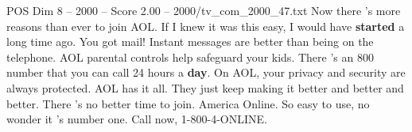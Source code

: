 \begin{textsample}{POS Dim 8 – 2000 – Score 2.00 – 2000/tv\_com\_2000\_47.txt}  \label{ex:f8_pos_033}
Now there 's more reasons than ever to join AOL.
If I knew it was this easy, I would have \textbf{started} a long time ago.
You got mail!
Instant messages are better than being on the telephone.
AOL parental controls help safeguard your kids.
There 's an 800 number that you can call 24 hours a \textbf{day}.
On AOL, your privacy and security are always protected.
AOL has it all.
They just keep making it better and better and better.
There 's no better time to join.
America Online.
So easy to use, no wonder it 's number one.
Call now, 1-800-4-ONLINE.

\end{textsample}
